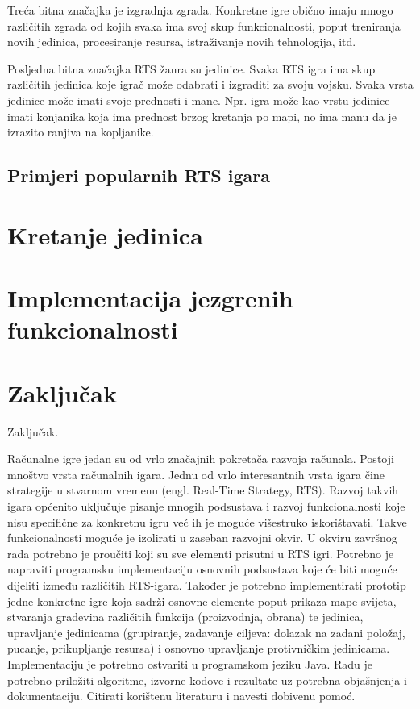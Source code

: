 \documentclass[times, utf8, zavrsni, numeric]{fer}
\begin{document}
\par Treća bitna značajka je izgradnja zgrada. Konkretne igre obično imaju mnogo različitih zgrada od kojih svaka ima svoj skup funkcionalnosti, poput treniranja novih jedinica, procesiranje resursa, istraživanje novih tehnologija, itd.  

\par Posljedna bitna značajka RTS žanra su jedinice. Svaka RTS igra ima skup različitih jedinica koje igrač može odabrati i izgraditi za svoju vojsku. Svaka vrsta jedinice može imati svoje prednosti i mane. Npr. igra može kao vrstu jedinice imati konjanika koja ima prednost brzog kretanja po mapi, no ima manu da je izrazito ranjiva na kopljanike.

\section{Primjeri popularnih RTS igara}

\chapter{Kretanje jedinica}\label{pathfinding}

\chapter{Implementacija jezgrenih funkcionalnosti}\label{implementation}

\chapter{Zaključak}\label{conclusion}
Zaključak.




\begin{sazetak}
Računalne igre jedan su od vrlo značajnih pokretača razvoja računala. Postoji mnoštvo vrsta računalnih igara. Jednu od vrlo interesantnih vrsta igara čine strategije u stvarnom vremenu (engl. Real-Time Strategy, RTS). Razvoj takvih igara općenito uključuje pisanje mnogih podsustava i razvoj funkcionalnosti koje nisu specifične za konkretnu igru već ih je moguće višestruko iskorištavati. Takve funkcionalnosti moguće je izolirati u zaseban razvojni okvir. U okviru završnog rada potrebno je proučiti koji su sve elementi prisutni u RTS igri. Potrebno je napraviti programsku implementaciju osnovnih podsustava koje će biti moguće dijeliti između različitih RTS-igara. Također je potrebno implementirati prototip jedne konkretne igre koja sadrži osnovne elemente poput prikaza mape svijeta, stvaranja građevina različitih funkcija (proizvodnja, obrana) te jedinica, upravljanje jedinicama (grupiranje, zadavanje ciljeva: dolazak na zadani položaj, pucanje, prikupljanje resursa) i osnovno upravljanje protivničkim jedinicama. 
Implementaciju je potrebno ostvariti u programskom jeziku Java. Radu je potrebno priložiti algoritme, izvorne kodove i rezultate uz potrebna objašnjenja i dokumentaciju. Citirati korištenu literaturu i navesti dobivenu pomoć.

\end{sazetak}
\end{document}

